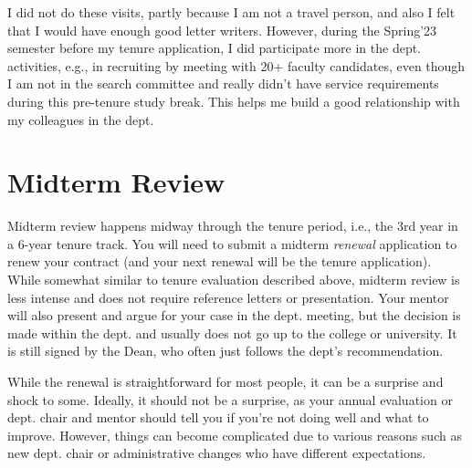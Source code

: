 \documentclass[oneside,11pt,dvipsnames]{book}
\begin{document}
I did not do these visits, partly because I am not a travel person, and also I felt that I would have enough good letter writers.
However, during the Spring'23 semester before my tenure application, I did participate more in the dept. activities, e.g., in recruiting by meeting with 20+ faculty candidates, even though I am not in the search committee and really didn't have service requirements during this pre-tenure study break. This helps me build a good relationship with my colleagues in the dept.



\section{Midterm Review}




Midterm review happens midway through the tenure period, i.e., the 3rd year in a 6-year tenure track. You will need to submit a midterm \emph{renewal} application to renew your contract (and your next renewal will be the tenure application).
While somewhat similar to tenure evaluation described above, midterm review is less intense and  does not require reference letters or presentation.
Your mentor will also present and argue for your case in the dept. meeting, but the decision is made within the dept. and usually does not go up to the college or university.  It is still signed by the Dean, who often just follows the dept's recommendation.

While the renewal is straightforward for most people, it can be a surprise and shock to some. Ideally, it should not be a surprise, as your annual evaluation or dept. chair and mentor should tell you if you're not doing well and what to improve.  However, things can become complicated due to various reasons such as new dept. chair or administrative changes who have different expectations. 


\end{document}

